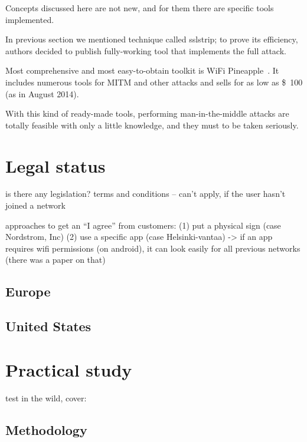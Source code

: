 \documentclass[12pt,a4paper,oneside,pdftex]{report}
\begin{document}
Concepts discussed here are not new, and for them there are specific tools implemented.

In previous section we mentioned technique called sslstrip; to prove its efficiency, authors decided to publish fully-working tool that implements the full attack.~\cite{marlinspike2009new}

Most comprehensive and most easy-to-obtain toolkit is WiFi Pineapple~\cite{wifipineapple}. It includes numerous tools for MITM and other attacks and sells for as low as \$~100 (as in August 2014).

With this kind of ready-made tools, performing man-in-the-middle attacks are totally feasible with only a little knowledge, and they must to be taken seriously.



\chapter{Legal status}
\label{chapter:legal}

is there any legislation? terms and conditions -- can't apply, if the user hasn't joined a network

approaches to get an ``I agree'' from customers: 
(1) put a physical sign (case Nordstrom, Inc) 
(2) use a specific app (case Helsinki-vantaa)
    -> if an app requires wifi permissions (on android), it can look easily for all previous networks (there was a paper on that)

\section{Europe}

\section{United States}




\chapter{Practical study}
\label{chapter:practical}

test in the wild, cover:

\section{Methodology}
\label{sec:methods}
\end{document}
